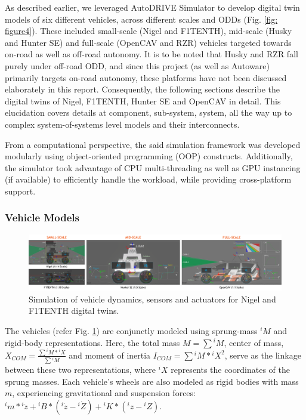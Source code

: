 As described earlier, we leveraged AutoDRIVE Simulator \cite{AutoDRIVESimulator, AutoDRIVESimulatorReport} to develop digital twin models of six different vehicles, across different scales and ODDs (Fig. \ref{fig: figure4}). These included small-scale (Nigel and F1TENTH), mid-scale (Husky and Hunter SE) and full-scale (OpenCAV and RZR) vehicles targeted towards on-road as well as off-road autonomy. It is to be noted that Husky and RZR fall purely under off-road ODD, and since this project (as well as Autoware) primarily targets on-road autonomy, these platforms have not been discussed elaborately in this report. Consequently, the following sections describe the digital twins of Nigel, F1TENTH, Hunter SE and OpenCAV in detail. This elucidation covers details at component, sub-system, system, all the way up to complex system-of-systems level models and their interconnects.

From a computational perspective, the said simulation framework was developed modularly using object-oriented programming (OOP) constructs. Additionally, the simulator took advantage of CPU multi-threading as well as GPU instancing (if available) to efficiently handle the workload, while providing cross-platform support.

\subsubsection{Vehicle Models}
\label{Vehicle Models}

\begin{figure}[t]
    \centering
    \includegraphics[width=\linewidth]{Figures/fig5.png}
    \caption{Simulation of vehicle dynamics, sensors and actuators for Nigel and F1TENTH digital twins.}
    \label{fig: figure5}
\end{figure}

The vehicles (refer Fig. \ref{fig: figure5}) are conjunctly modeled using sprung-mass ${^iM}$ and rigid-body representations. Here, the total mass $M=\sum{^iM}$, center of mass, $X_{COM} = \frac{\sum{{^iM}*{^iX}}}{\sum{^iM}}$ and moment of inertia $I_{COM} = \sum{{^iM}*{^iX^2}}$, serve as the linkage between these two representations, where ${^iX}$ represents the coordinates of the sprung masses. Each vehicle's wheels are also modeled as rigid bodies with mass $m$, experiencing gravitational and suspension forces: ${^im} * {^i{\ddot{z}}} + {^iB} * ({^i{\dot{z}}}-{^i{\dot{Z}}}) + {^iK} * ({^i{z}}-{^i{Z}})$.

